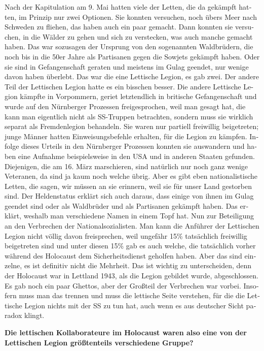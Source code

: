 \begin{otherlanguage}{ngerman}
Nach der Kapitulation am 9. Mai hatten viele der Letten, die da gekämpft hatten, im Prinzip nur zwei Optionen. Sie konnten versuchen, noch übers Meer nach Schweden zu fliehen, das haben auch ein paar gemacht. Dann konnten sie versuchen, in die Wälder zu gehen und sich zu verstecken, was auch manche gemacht haben. Das war sozusagen der Ursprung von den sogenannten Waldbrüdern, die noch bis in die 50er Jahre als Partisanen gegen die Sowjets gekämpft haben. Oder sie sind in Gefangenschaft geraten und meistens im Gulag geendet, nur wenige davon haben überlebt. 
Das war die eine Lettische Legion, es gab zwei. Der andere Teil der Lettischen Legion hatte es ein bisschen besser. Die andere Lettische Legion kämpfte in Vorpommern, geriet letztendlich in britische Gefangenschaft und wurde auf den Nürnberger Prozessen freigesprochen, weil man gesagt hat, die kann man eigentlich nicht als SS-Truppen betrachten, sondern muss sie wirklich separat als Fremdenlegion behandeln. Sie waren nur partiell freiwillig beigetreten; junge Männer hatten Einweisungsbefehle erhalten, für die Legion zu kämpfen. Infolge dieses Urteils in den Nürnberger Prozessen konnten sie auswandern und haben eine Aufnahme beispielsweise in den USA und in anderen Staaten gefunden. 
Diejenigen, die am 16. März marschieren, sind natürlich nur noch ganz wenige Veteranen, da sind ja kaum noch welche übrig. Aber es gibt eben nationalistische Letten, die sagen, wir müssen an sie erinnern, weil sie für unser Land gestorben sind. Der Heldenstatus erklärt sich auch daraus, dass einige von ihnen im Gulag geendet sind oder als Waldbrüder und als Partisanen gekämpft haben. Das erklärt, weshalb man verschiedene Namen in einem Topf hat. 
Nun zur Beteiligung an den Verbrechen der Nationalsozialisten. Man kann die Anführer der Lettischen Legion nicht völlig davon freisprechen, weil ungefähr 15\% tatsächlich freiwillig beigetreten sind und unter diesen 15\% gab es auch welche, die tatsächlich vorher während des Holocaust dem Sicherheitsdienst geholfen haben. Aber das sind einzelne, es ist definitiv nicht die Mehrheit. Das ist wichtig zu unterscheiden, denn der Holocaust war in Lettland 1943, als die Legion gebildet wurde, abgeschlossen. Es gab noch ein paar Ghettos, aber der Großteil der Verbrechen war vorbei. Insofern muss man das trennen und muss die lettische Seite verstehen, für die die Lettische Legion nichts mit der SS zu tun hat, auch wenn es aus deutscher Sicht paradox klingt. 

\textbf{Die lettischen Kollaborateure im Holocaust waren also eine von der Lettischen Legion größtenteils verschiedene Gruppe?} 


\end{otherlanguage}
